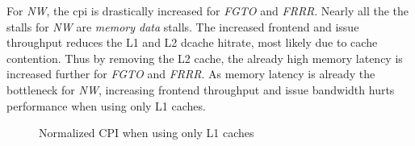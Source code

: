 For \textit{NW}, the \acrshort{cpi} is drastically increased for \textit{FGTO} and \textit{FRRR}. Nearly all the the stalls for \textit{NW} are \textit{memory data} stalls. The increased frontend and issue throughput reduces the L1 and L2 dcache hitrate, most likely due to cache contention. Thus by removing the L2 cache, the already high memory latency is increased further for \textit{FGTO} and \textit{FRRR}. As memory latency is already the bottleneck for \textit{NW}, increasing frontend throughput and issue bandwidth hurts performance when using only L1 caches.   

\begin{figure}
    \centering
    \caption{Normalized CPI when using only L1 caches}
    \label{fig:norm_cpi_L1}
\end{figure}